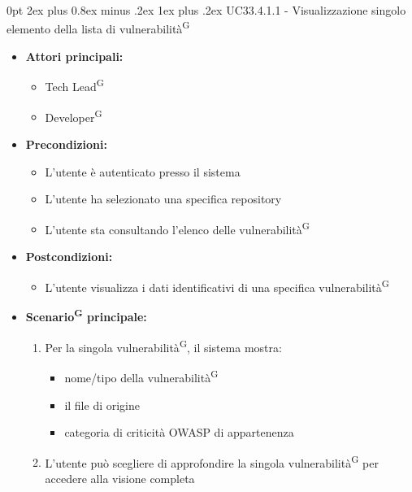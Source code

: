 \documentclass[a4paper, 11pt]{article}
\makeatletter
\renewcommand\subparagraph{\@startsection{subparagraph}{5}
  {0pt}
  {2ex plus 0.8ex minus .2ex}
  {1ex plus .2ex}
  {\normalfont\normalsize\bfseries\color{AccentColor}}}
\makeatother
\begin{document}
\subparagraph{UC33.4.1.1 - Visualizzazione singolo elemento della lista di vulnerabilità\textsuperscript{G}}\label{UC33.4.1.1}
\begin{itemize}
    \item \textbf{Attori principali:} 
    \begin{itemize}
        \item Tech Lead\textsuperscript{G}
        \item Developer\textsuperscript{G}
    \end{itemize}
    \item \textbf{Precondizioni:} 
    \begin{itemize}
        \item L'utente è autenticato presso il sistema
        \item L’utente ha selezionato una specifica repository
        \item L'utente sta consultando l'elenco delle vulnerabilità\textsuperscript{G}
    \end{itemize}
    \item \textbf{Postcondizioni:}
    \begin{itemize}
        \item L'utente visualizza i dati identificativi di una specifica vulnerabilità\textsuperscript{G}
    \end{itemize}
    \item \textbf{Scenario\textsuperscript{G} principale:}
    \begin{enumerate}
        \item Per la singola vulnerabilità\textsuperscript{G}, il sistema mostra: 
            \begin{itemize}
                \item nome/tipo della vulnerabilità\textsuperscript{G}
                \item il file di origine
                \item categoria di criticità OWASP di appartenenza
            \end{itemize}
        \item L'utente può scegliere di approfondire la singola vulnerabilità\textsuperscript{G} per accedere alla visione completa
    \end{enumerate}
\end{itemize}
\end{document}
